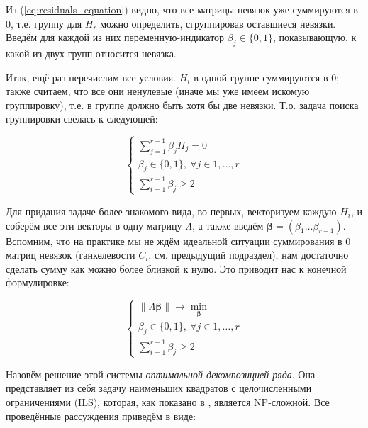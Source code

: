 	    	Из (\ref{eq:residuals_equation}) видно, что все матрицы невязок уже суммируются в $ 0 $, т.е. группу для $ H_r $ можно определить, сгруппировав оставшиеся невязки. Введём для каждой из них переменную-индикатор $ \beta_j \in \{0, 1\} $, показывающую, к какой из двух групп относится невязка. 
	    	
	    	Итак, ещё раз перечислим все условия. $ H_i $ в одной группе суммируются в $ 0 $; также считаем, что все они ненулевые (иначе мы уже имеем искомую группировку), т.е. в группе должно быть хотя бы две невязки. Т.о. задача поиска группировки свелась к следующей:
	    	
	    	\begin{equation}
	    		\begin{cases*}
	    			\sum\limits_{j = 1}^{r - 1} \beta_j H_j = 0 \\
	    			\beta_j \in \{0, 1\}, \ \forall j \in 1, \ldots, r \\
	    			\sum\limits_{i = 1}^{r - 1} \beta_j \ge 2
	    		\end{cases*}
	    	\end{equation}
	    	
	    	Для придания задаче более знакомого вида, во-первых, векторизуем каждую $ H_i $, и соберём все эти векторы в одну матрицу $ \Lambda $, а также введём $ \boldsymbol{\beta} = (\beta_1 \ldots \beta_{r-1}) $. Вспомним, что на практике мы не ждём идеальной ситуации суммирования в $ 0 $ матриц невязок (ганкелевости $ C_i $, см. предыдущий подраздел), нам достаточно сделать сумму как можно более близкой к нулю. Это приводит нас к конечной формулировке:
	    	
	    	\begin{equation}\label{eq:decomp_search_final}
	    		\begin{cases*}
	    			\lVert \Lambda \boldsymbol{\beta} \rVert \to \underset{\boldsymbol{\beta}}{\min} \\
	    			\beta_j \in \{0, 1\}, \ \forall j \in 1, \ldots, r \\
	    			\sum\limits_{i = 1}^{r - 1} \beta_j \ge 2
	    		\end{cases*}
	    	\end{equation}
	    	
	    	Назовём решение этой системы \emph{оптимальной декомпозицией ряда}. Она представляет из себя задачу наименьших квадратов с целочисленными ограничениями (ILS), которая, как показано в \cite{van1981another}, является NP-сложной. Все проведённые рассуждения приведём в виде:
	    	
